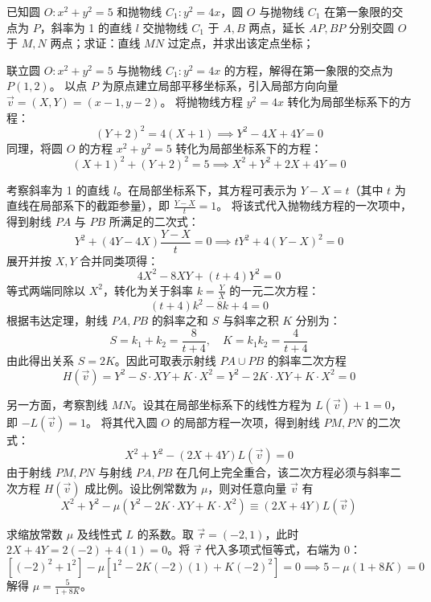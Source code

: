 \begin{exercise}
已知圆 \( O: x^2 + y^2 = 5 \) 和抛物线 \( C_1: y^2 = 4x \)，圆 \( O \) 与抛物线 \( C_1 \) 在第一象限的交点为 \( P \)，斜率为 1 的直线 \( l \) 交抛物线 \( C_1 \) 于 \( A,B \) 两点，延长 \( AP,BP \) 分别交圆 \( O \) 于 \( M,N \) 两点；求证：直线 \( MN \) 过定点，并求出该定点坐标；
\end{exercise}
\begin{solution}
联立圆 $O: x^2 + y^2 = 5$ 与抛物线 $C_1: y^2 = 4x$ 的方程，解得在第一象限的交点为 $P(1, 2)$。
以点 $P$ 为原点建立局部平移坐标系，引入局部方向向量 $\vec{v} = (X, Y) = (x-1, y-2)$。
将抛物线方程 $y^2 = 4x$ 转化为局部坐标系下的方程：
$$ (Y+2)^2 = 4(X+1) \implies Y^2 - 4X + 4Y = 0 $$
同理，将圆 $O$ 的方程 $x^2 + y^2 = 5$ 转化为局部坐标系下的方程：
$$ (X+1)^2 + (Y+2)^2 = 5 \implies X^2 + Y^2 + 2X + 4Y = 0 $$

考察斜率为 1 的直线 $l$。在局部坐标系下，其方程可表示为 $Y - X = t$（其中 $t$ 为直线在局部系下的截距参量），即 $\frac{Y-X}{t} = 1$。
将该式代入抛物线方程的一次项中，得到射线 $PA$ 与 $PB$ 所满足的二次式：
$$ Y^2 + (4Y - 4X)\frac{Y-X}{t} = 0 \implies tY^2 + 4(Y-X)^2 = 0 $$
展开并按 $X, Y$ 合并同类项得：
$$ 4X^2 - 8XY + (t+4)Y^2 = 0 $$
等式两端同除以 $X^2$，转化为关于斜率 $k = \frac{Y}{X}$ 的一元二次方程：
$$ (t+4)k^2 - 8k + 4 = 0 $$
根据韦达定理，射线 $PA, PB$ 的斜率之和 $S$ 与斜率之积 $K$ 分别为：
$$ S = k_1 + k_2 = \frac{8}{t+4}, \quad K = k_1 k_2 = \frac{4}{t+4} $$
由此得出关系 $S = 2K$。因此可取表示射线 $PA \cup PB$ 的斜率二次方程
$$ H(\vec{v}) = Y^2 - S \cdot XY + K \cdot X^2 = Y^2 - 2K \cdot XY + K \cdot X^2 = 0 $$

另一方面，考察割线 $MN$。设其在局部坐标系下的线性方程为 $L(\vec{v}) + 1 = 0$，即 $-L(\vec{v}) = 1$。
将其代入圆 $O$ 的局部方程一次项，得到射线 $PM, PN$ 的二次式：
$$ X^2 + Y^2 - (2X + 4Y)L(\vec{v}) = 0 $$
由于射线 $PM, PN$ 与射线 $PA, PB$ 在几何上完全重合，该二次方程必须与斜率二次方程 $H(\vec{v})$ 成比例。设比例常数为 $\mu$，则对任意向量 $\vec{v}$ 有
$$ X^2 + Y^2 - \mu (Y^2 - 2K \cdot XY + K \cdot X^2) \equiv (2X + 4Y)L(\vec{v}) $$

求缩放常数 $\mu$ 及线性式 $L$ 的系数。取 $\vec{\tau} = (-2, 1)$，此时 $2X + 4Y = 2(-2) + 4(1) = 0$。将 $\vec{\tau}$ 代入多项式恒等式，右端为 $0$：
$$ [(-2)^2 + 1^2] - \mu [1^2 - 2K(-2)(1) + K(-2)^2] = 0 \implies 5 - \mu (1 + 8K) = 0 $$
解得 $\mu = \frac{5}{1+8K}$。


\end{solution}
